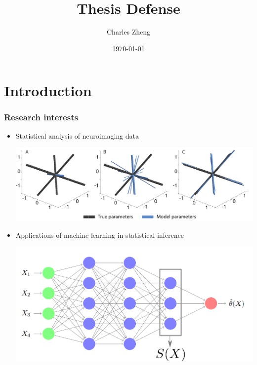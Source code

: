 \documentclass{beamer}
\title[Defense]{Thesis Defense}
\author{Charles Zheng} %
\institute[Stanford] %
{Stanford University}
\date{\today} %
\begin{document}
\begin{frame}
\titlepage %
\end{frame}

\section{Introduction}

\begin{frame}
\frametitle{Research interests}
\begin{itemize}
\item Statistical analysis of neuroimaging data
\begin{center}
\includegraphics[scale = 0.2]{3D_fit_DTI_NNLS_EBP.pdf}
\end{center}
\item Applications of machine learning in statistical inference
\begin{center}
\includegraphics[scale = 0.2]{dnn_sx.png}
\end{center}
\end{itemize}
\end{frame}
\end{document}
